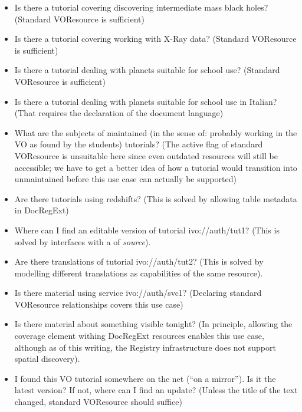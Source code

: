 \documentclass{ivoa}
\begin{document}
\begin{itemize}

\item Is there a tutorial covering discovering intermediate mass black
holes? (Standard VOResource is sufficient){}

\item Is there a tutorial covering working with X-Ray data? (Standard
VOResource is sufficient){}

\item Is there a tutorial dealing with planets suitable for school use?
(Standard VOResource is sufficient){}

\item Is there a tutorial dealing with planets suitable for school use in
Italian? (That requires the declaration of the document language){}

\item What are the subjects of maintained (in the sense of: probably
working in the VO as found by the students) tutorials?
(The active flag of standard VOResource is
unsuitable here since even outdated resources will still be accessible;
we have to get a better idea of how a tutorial would transition into
unmaintained before this use case can actually be supported)

\item Are there tutorials using redshifts? (This is solved by allowing
table metadata in DocRegExt){}

\item Where can I find an editable version of tutorial ivo://auth/tut1?
(This is solved by interfaces with a  of \textit{source}).

\item Are there translations of tutorial ivo://auth/tut2? (This is
solved by modelling different translations as capabilities of the same
resource).

\item Is there material using service ivo://auth/svc1? (Declaring
standard VOResource relationships covers this use case)

\item Is there material about something visible tonight? (In principle,
allowing the coverage element withing DocRegExt resources enables this
use case, although as of this writing, the Registry infrastructure does
not support spatial discovery).

\item I found this VO tutorial somewhere on the net (``on a mirror'').  Is it
the latest version?  If not, where can I find an update? (Unless the
title of the text changed, standard VOResource should suffice){}

\end{itemize}
\end{document}
